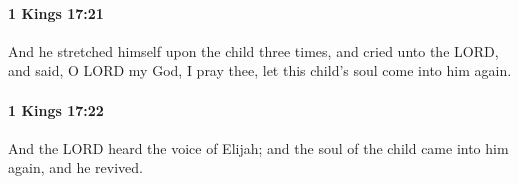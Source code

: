 		\paragraph{1 Kings 17:21} %
			\label{1KINGS-17-21}

			And he stretched himself upon the child three times, and cried unto the LORD, and said, O LORD my God, I pray thee, let this child’s soul come into him again.


		\paragraph{1 Kings 17:22} %
			\label{1KINGS-17-22}

			And the LORD heard the voice of Elijah; and the soul of the child came into him again, and he revived.


